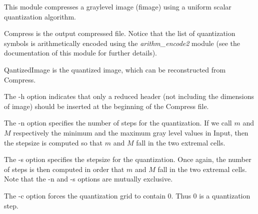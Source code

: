 This module compresses a graylevel image (fimage) using a uniform scalar
 quantization algorithm. 

Compress is the output compressed file. Notice that the list 
of quantization symbols is arithmetically encoded using the 
{\em arithm\_encode2} module (see the documentation of this module 
for further details). 

QantizedImage is the quantized image, which can be reconstructed 
from Compress. 

The -h option indicates that only a reduced header (not including 
the dimensions of image) should be inserted at the beginning 
of the Compress file. 

The -n option specifies the number of steps for the quantization. 
If we call $m$ and $M$ respectively the minimum and the maximum gray level 
values in Input, then the stepsize is computed so that $m$ and $M$ fall 
in the two extremal cells. 

The -s option specifies the stepsize for the quantization. Once again, 
the number of steps is then computed in order that $m$ and $M$ fall 
in the two extremal cells. Note that the -n and -s options are mutually 
exclusive. 

The -c option forces the quantization grid to contain 0. Thus 0 
is a quantization step. 
